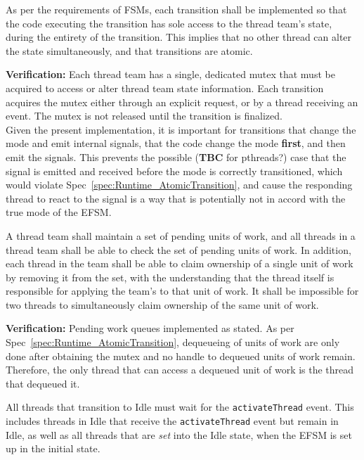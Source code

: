 \documentclass{article}
\begin{document}
\begin{spec}
\label{spec:Runtime_AtomicTransition}
As per the requirements of FSMs, each transition shall be implemented so that
the code executing the transition has sole access to the thread team's state,
during the entirety of the transition.  This implies that no other thread can
alter the state simultaneously, and that transitions are atomic.
\end{spec}
\textbf{Verification:}\hspace{0.125in}  Each thread team has a single,
dedicated mutex that must be acquired to access or alter thread team state
information.  Each transition acquires the mutex either through an explicit
request, or by a thread receiving an event.  The mutex is not released until
the transition is finalized.\\


Given the present implementation, it is important for transitions that
change the mode and emit internal signals, that the code change the mode
\textbf{first}, and then emit the signals.  This prevents the possible
(\textbf{TBC} for pthreads?) case that the signal is emitted and received before
the mode is correctly transitioned, which would violate
Spec~\ref{spec:Runtime_AtomicTransition}, and cause the responding thread
to react to the signal is a way that is potentially not in accord with the true
mode of the EFSM.

\begin{spec}
A thread team shall maintain a set of pending units of work, and all threads in a
thread team shall be able to check the set of pending units of work.  In
addition, each thread in the team shall be able to claim ownership of a single
unit of work by removing it from the set, with the understanding that the thread
itself is responsible for applying the team's \taskroutine to that unit of work.  It
shall be impossible for two threads to simultaneously claim ownership of the
same unit of work.
\end{spec}
\textbf{Verification:}\hspace{0.125in}  Pending work queues implemented as
stated.  As per Spec~\ref{spec:Runtime_AtomicTransition}, dequeueing of units of
work are only done after obtaining the mutex and no handle to dequeued units of
work remain.  Therefore, the only thread that can access a dequeued unit of work
is the thread that dequeued it.
\begin{spec}
All threads that transition to Idle must wait for the \texttt{activateThread}
event.  This includes threads in Idle that receive the \texttt{activateThread}
event but remain in Idle, as well as all threads that are \textit{set} into the
Idle state, when the EFSM is set up in the initial state.
\label{spec:IdleActivateThread}
\end{spec}
\end{document}
